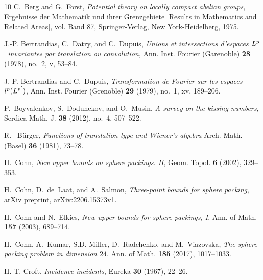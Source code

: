 \documentclass[[a4paper,english,12pt]{amsart}
\theoremstyle{plain}
\theoremstyle{remark}
\begin{document}
\begin{thebibliography}{10}
C.~Berg and G.~Forst, \emph{Potential theory on locally compact abelian
  groups}, Ergebnisse der Mathematik und ihrer Grenzgebiete [Results in
  Mathematics and Related Areas], vol. Band 87, Springer-Verlag, New
  York-Heidelberg, 1975.

J.-P. Bertrandias, C.~Datry, and C.~Dupuis, \emph{Unions et intersections
  d'espaces {$L\sp{p}$}\ invariantes par translation ou convolution}, Ann.
  Inst. Fourier (Garenoble) \textbf{28} (1978), no.~2, v, 53--84.

J.-P. Bertrandias and C.~Dupuis, \emph{Transformation de {F}ourier sur les
  espaces {$l\sp{p}(L\sp{p\sp{\prime} })$}}, Ann. Inst. Fourier (Grenoble)
  \textbf{29} (1979), no.~1, xv, 189--206.



P.~Boyvalenkov, S.~Dodunekov, and O.~Musin, \emph{A survey on the kissing
  numbers}, Serdica Math. J. \textbf{38} (2012), no.~4, 507--522.

 R.~ Bürger, \emph{Functions of translation type and Wiener's algebra} Arch. Math. (Basel) \textbf{36} (1981), 73--78.


H.~Cohn, \emph{New upper bounds on sphere packings. {II}}, Geom. Topol.
  \textbf{6} (2002), 329--353.

H.~Cohn, D.~de~Laat, and A.~Salmon, \emph{Three-point bounds for sphere
  packing}, arXiv preprint, arXiv:2206.15373v1.

H.~Cohn and N.~Elkies, \emph{New upper bounds for sphere packings, {I}}, Ann.
  of Math. \textbf{157} (2003), 689--714.

H.~Cohn, A.~Kumar, S.D. Miller, D.~Radchenko, and M.~Viazovska, \emph{The
  sphere packing problem in dimension $24$}, Ann. of Math. \textbf{185} (2017),
  1017--1033.


H. T. Croft,
\emph{Incidence incidents},
Eureka \textbf{30} (1967), 22--26.



\end{thebibliography}
\end{document}
